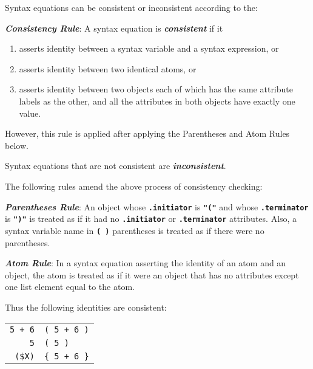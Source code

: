 \documentclass[12pt]{article}
\newcommand{\TT}[1]{{\tt \bfseries #1}}
\newcommand{\key}[1]{{\bf \em #1}\index{#1}}
\newcommand{\ikey}[2]{{\bf \em #1}\index{#2}}
\newenvironment{indpar}[1][0.3in]%
	{\begin{list}{}%
		     {\setlength{\itemsep}{0in}%
		      \setlength{\topsep}{0in}%
		      \setlength{\parsep}{1ex}%
		      \setlength{\labelwidth}{#1}%
		      \setlength{\leftmargin}{#1}%
		      \addtolength{\leftmargin}{\labelsep}}%
	 \item}%
	{\end{list}}
\begin{document}
Syntax equations can be consistent or inconsistent according to the:

\begin{indpar}
\begin{list}{}{}
\item[\ikey{Consistency Rule}{consistency rule}:]
A syntax equation is \key{consistent} if it
\begin{enumerate}
\item asserts identity between a syntax variable and a syntax expression, or
\item asserts identity between two identical atoms, or
\item asserts identity between two objects each of which has the same
attribute labels as the other, and all the attributes in both objects
have exactly one value.
\end{enumerate}
However, this rule is applied after applying the Parentheses
and Atom Rules below.

Syntax equations that are not consistent are \key{inconsistent}.
\end{list}
\end{indpar}

The following rules amend the above process of consistency checking:

\begin{indpar}
\begin{list}{}{}
\item[\ikey{Parentheses Rule}{parentheses rule}:]\label{PARENTHESES-RULE}
An object whose \TT{.initiator} is \TT{"("} and whose
\TT{.terminator} is \TT{")"} is treated as if it had no
\TT{.initiator} or \TT{.terminator} attributes.
Also, a syntax variable name in \TT{( )} parentheses is treated
as if there were no parentheses.

\item[\ikey{Atom Rule}{atom rule}:]\label{ATOM-RULE}
In a syntax equation asserting the identity of an atom and an object,
the atom is treated as if it were an object that has
no attributes except one list element equal to the atom.
\end{list}
\end{indpar}

Thus the following identities are consistent:

\begin{center}
\begin{tabular}{r@\TT{~:=:~}l}
\verb/5 + 6/ & \verb/( 5 + 6 )/ \\
\verb/5/ & \verb/( 5 )/ \\
\verb/($X)/ & \verb/{ 5 + 6 }/ \\
\end{tabular}
\end{center}
\end{document}
